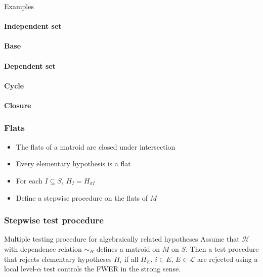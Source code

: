 \documentclass[bigger]{beamer}
\begin{document}
\begin{frame}{Examples}
\framesubtitle<1>{Independent set}
\framesubtitle<2>{Base}
\framesubtitle<4>{Dependent set}
\framesubtitle<3>{Cycle}
\framesubtitle<5>{Closure}
\end{frame}








\begin{frame}
\frametitle{Flats}
\begin{itemize}

\item The flats of a matroid are closed under intersection

\item Every elementary hypothesis is a flat
\item For each $I \subseteq S$, $H_I = H_{\sigma I}$
\item Define a stepwise procedure on the flats of $M$


\end{itemize} %
\end{frame}

\begin{frame}
 \frametitle{Stepwise test procedure}
 \begin{block}{Multiple testing procedure for algebraically related hypotheses}
   Assume that $\mathscr{H}$ with dependence relation $\sim_H$
   defines a matroid on $M$ on $S$. Then a test procedure that
   rejects elementary hypotheses $H_i$ if all $H_E$, $i \in E$, $E
   \in \mathscr{L}$ are rejected using a local level-$\alpha$ test
   controls the FWER in the strong sense.
 \end{block}

\end{frame}
\end{document}
